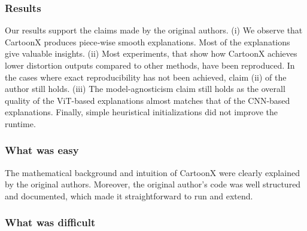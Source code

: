 \subsubsection*{Results}


Our results support the claims made by the original authors. (i) We observe that CartoonX produces piece‐wise smooth explanations. Most of the explanations give valuable insights. (ii) Most experiments, that show how CartoonX achieves lower distortion outputs compared to other methods, have been reproduced. In the cases where exact reproducibility has not been achieved, claim (ii) of the author still holds. (iii) The model-agnosticism claim still holds as the overall quality of the ViT-based explanations almost matches that of the CNN-based explanations. Finally, simple heuristical initializations did not improve the runtime.

\subsubsection*{What was easy}


The mathematical background and intuition of CartoonX were clearly explained by the original authors. Moreover, the original author's code was well structured and documented, which made it straightforward to run and extend.

\subsubsection*{What was difficult}


